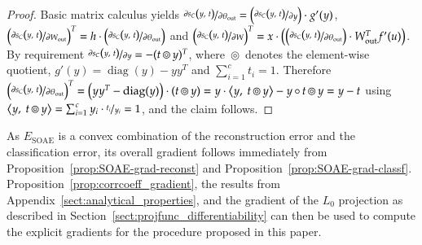 \documentclass[twoside,11pt]{article}
\DeclareMathOperator{\hada}{\circ}
\DeclareMathOperator{\hadadiff}{\circledcirc}
\DeclareMathOperator{\diag}{diag}
\DeclareMathOperator{\SOAE}{SOAE}
\DeclareMathOperator{\out}{out}
\newcommand{\0}{\mathcal{O}}
\newcommand{\transp}{^T}
\newcommand{\scp}[2]{\left<#1,\ #2\right>}
\begin{document}
\begin{proof}
Basic matrix calculus \citep{Neudecker1969,Vetter1970} yields
$\nicefrac{\partial s_C\left(y,\ t\right)}{\partial \theta_{\out}} = \left(\nicefrac{\partial s_C\left(y,\ t\right)}{\partial y}\right)\cdot g'(y)$,
$\left(\nicefrac{\partial s_C\left(y,\ t\right)}{\partial W_{\out}}\right)\transp = h\cdot \left(\nicefrac{\partial s_C\left(y,\ t\right)}{\partial \theta_{\out}}\right)$ and
$\left(\nicefrac{\partial s_C\left(y,\ t\right)}{\partial W}\right)\transp = x \cdot \left(\left(\nicefrac{\partial s_C\left(y,\ t\right)}{\partial \theta_{\out}}\right)\cdot W_{\out}\transp f'(u)\right)$.
By requirement $\nicefrac{\partial s_C\left(y,\ t\right)}{\partial y} = -(t\hadadiff y)\transp$, where $\hadadiff$ denotes the element-wise quotient, $g'(y) = \diag(y) - yy\transp$ and $\sum_{i=1}^c t_i = 1$.
Therefore $\left(\nicefrac{\partial s_C\left(y,\ t\right)}{\partial \theta_{\out}}\right)\transp = \left(yy\transp - \diag(y)\right)\cdot (t\hadadiff y) = y\cdot\scp{y}{t\hadadiff y} - y\hada t\hadadiff y = y - t$ using $\scp{y}{t\hadadiff y} = \sum\nolimits_{i=1}^c y_i\cdot\nicefrac{t_i}{y_i} = 1$, and the claim follows.
\end{proof}
As $E_{\SOAE}$ is a convex combination of the reconstruction error and the classification error, its overall gradient follows immediately from Proposition~\ref{prop:SOAE-grad-reconst} and Proposition~\ref{prop:SOAE-grad-classf}.
Proposition~\ref{prop:corrcoeff_gradient}, the results from Appendix~\ref{sect:analytical_properties}, and the gradient of the $L_0$ projection as described in Section~\ref{sect:projfunc_differentiability} can then be used to compute the explicit gradients for the procedure proposed in this paper.


\end{document}
